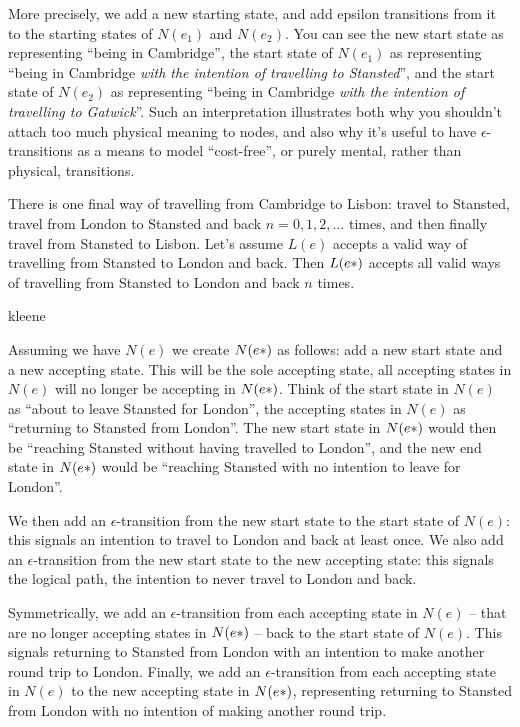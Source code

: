 More precisely, we add a new starting state, and add epsilon transitions from it to the starting states of $N(e_1)$ and $N(e_2)$. You can see the new start state as representing ``being in Cambridge'', the start state of $N(e_1)$ as representing ``being in Cambridge \textit{with the intention of travelling to Stansted}'', and the start state of $N(e_2)$ as representing ``being in Cambridge \textit{with the intention of travelling to Gatwick}''. Such an interpretation illustrates both why you shouldn't attach too much physical meaning to nodes, and also why it's useful to have $\epsilon$-transitions as a means to model ``cost-free'', or purely mental, rather than physical, transitions.

There is one final way of travelling from Cambridge to Lisbon: travel to Stansted, travel from London to Stansted and back $n = 0, 1, 2, \ldots$ times, and then finally travel from Stansted to Lisbon. Let's assume $L(e)$ accepts a valid way of travelling from Stansted to London and back. Then $L(e\*)$ accepts all valid ways of travelling from Stansted to London and back $n$ times. 

\begin{center}
    {kleene}
\end{center}

Assuming we have $N(e)$ we create $N(e\*)$ as follows: add a new start state and a new accepting state. This will be the sole accepting state, all accepting states in $N(e)$ will no longer be accepting in $N(e\*)$. Think of the start state in $N(e)$ as ``about to leave Stansted for London'', the accepting states in $N(e)$ as ``returning to Stansted from London''. The new start state in $N(e\*)$ would then be ``reaching Stansted without having travelled to London'', and the new end state in $N(e\*)$ would be ``reaching Stansted with no intention to leave for London''. 

We then add an $\epsilon$-transition from the new start state to the start state of $N(e)$: this signals an intention to travel to London and back at least once. We also add an $\epsilon$-transition from the new start state to the new accepting state: this signals the logical path, the intention to never travel to London and back. 

Symmetrically, we add an $\epsilon$-transition from each accepting state in $N(e)$ -- that are no longer accepting states in $N(e\*)$ -- back to the start state of $N(e)$. This signals returning to Stansted from London with an intention to make another round trip to London. Finally, we add an $\epsilon$-transition from each accepting state in $N(e)$ to the new accepting state in $N(e\*)$, representing returning to Stansted from London with no intention of making another round trip.

